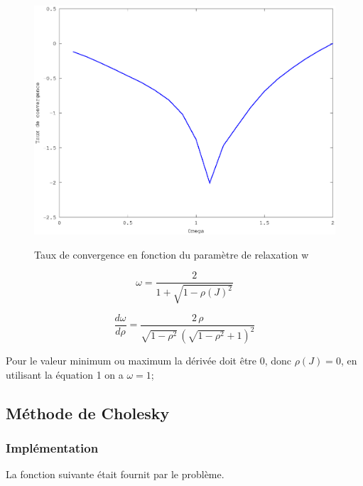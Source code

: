 \documentclass[a4paper,11pt]{article}
\begin{document}
\begin{figure}[h!]
  \begin{centering}
    \includegraphics[scale=0.5]{../relaxation_conv}
    \label{rspro2}
    \par\end{centering}
  \caption{Taux de convergence en fonction du paramètre de relaxation w}
  \label{fig:jacobi-conv}
\end{figure}

\begin{equation}
  \omega = \frac{2}{1+\sqrt{1- \rho(J)^2}}
\end{equation}

\begin{equation}
  \frac{d\omega}{d\rho} =\frac{2\,\rho}{\sqrt{1-{\rho}^{2}}\,{\left( \sqrt{1-{\rho}^{2}}+1\right) }^{2}}
\end{equation}

Pour le valeur  minimum ou maximum la dérivée doit être  0, donc $\rho(J)=0$, en
utilisant la équation 1 on a $\omega=1$;

\newpage
\subsection{Méthode de Cholesky}
\subsubsection{Implémentation}

La fonction suivante était fournit par le problème. 
\begin{multicols}{2}
  
\end{multicols}
\end{document}
